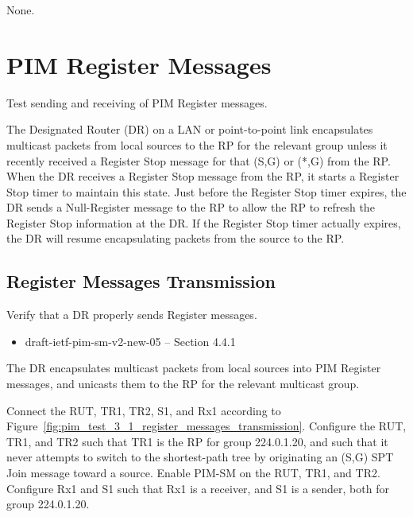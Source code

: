 \documentclass[11pt]{report}
\begin{document}
None.


\chapter{PIM Register Messages}

Test sending and receiving of PIM Register messages.

The Designated Router (DR) on a LAN or point-to-point link encapsulates
multicast packets from local sources to the RP for the relevant group
unless it recently received a Register Stop message for that (S,G) or
(*,G) from the RP.  When the DR receives a Register Stop message from
the RP, it starts a Register Stop timer to maintain this state.  Just
before the Register Stop timer expires, the DR sends a Null-Register
message to the RP to allow the RP to refresh the Register Stop
information at the DR.  If the Register Stop timer actually expires, the
DR will resume encapsulating packets from the source to the RP.

\newpage
\section{Register Messages Transmission}

Verify that a DR properly sends Register messages.

\begin{itemize}
  \item draft-ietf-pim-sm-v2-new-05 -- Section 4.4.1
\end{itemize}

The DR encapsulates multicast packets from local sources into PIM Register
messages, and unicasts them to the RP for the relevant multicast group.

Connect the RUT, TR1, TR2, S1, and Rx1 according to
Figure~\ref{fig:pim_test_3_1_register_messages_transmission}.
Configure the RUT, TR1, and TR2 such that TR1 is the RP for group 224.0.1.20,
and such that it never attempts to switch to the shortest-path tree by
originating an (S,G) SPT Join message toward a source.
Enable PIM-SM on the RUT, TR1, and TR2.
Configure Rx1 and S1 such that Rx1 is a receiver, and S1 is a sender,
both for group 224.0.1.20.
\end{document}
